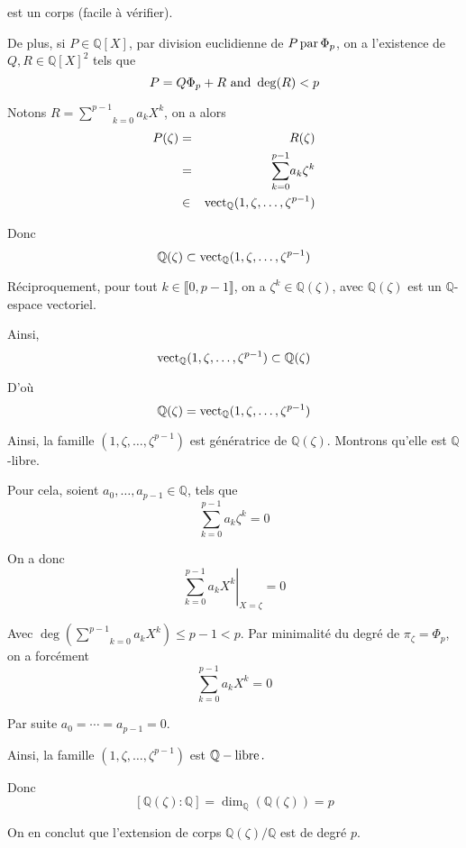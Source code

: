 est un corps (facile {\`a} v{\'e}rifier).

De plus, si $P \in \mathbb{Q} [X]$, par division euclidienne de $P \operatorname{par}
\Phi_p$, on a l'existence de $Q, R \in \mathbb{Q} [X]^2$ tels que
\[ P = Q \Phi_p + R \text{ and } \deg (R) < p \]


Notons $R = \underset{k = 0}{\overset{p - 1}{\sum}} a_k X^k$, on a alors
\begin{eqnarray*}
  P (\zeta) & = & R (\zeta)\\
  & = & \underset{k = 0}{\overset{p - 1}{\sum}} a_k \zeta^k\\
  & \in & \operatorname{vect}_{\mathbb{Q}} (1, \zeta, \ldots, \zeta^{p - 1})
\end{eqnarray*}


Donc
\[ \mathbb{Q} (\zeta) \subset \operatorname{vect}_{\mathbb{Q}} (1, \zeta, \ldots,
   \zeta^{p - 1}) \]


R{\'e}ciproquement, pour tout $k \in \llbracket 0, p - 1 \rrbracket$, on a
$\zeta^k \in \mathbb{Q} (\zeta)$, avec $\mathbb{Q} (\zeta)$ est un
$\mathbb{Q}$-espace vectoriel.

Ainsi,
\[ \operatorname{vect}_{\mathbb{Q}} (1, \zeta, \ldots, \zeta^{p - 1}) \subset
   \mathbb{Q} (\zeta) \]


D'o{\`u}
\[ \mathbb{Q} (\zeta) = \operatorname{vect}_{\mathbb{Q}} (1, \zeta, \ldots, \zeta^{p -
   1}) \]


Ainsi, la famille $(1, \zeta, \ldots, \zeta^{p - 1})$ est g{\'e}n{\'e}ratrice
de $\mathbb{Q} (\zeta)$. Montrons qu'elle est $\mathbb{Q}$-libre.

Pour cela, soient $a_0, \ldots, a_{p - 1} \in \mathbb{Q}$, tels que
\[ \underset{k = 0}{\overset{p - 1}{\sum}} a_k \zeta^k = 0 \]


On a donc
\[ \left. \underset{k = 0}{\overset{p - 1}{\sum}} a_k X^k \right|_{X = \zeta}
   = 0 \]


Avec $\deg \left( \underset{k = 0}{\overset{p - 1}{\sum}} a_k X^k \right)
\leqslant p - 1 < p$. Par minimalit{\'e} du degr{\'e} de $\pi_{\zeta} =
\Phi_p$, on a forc{\'e}ment
\[ \underset{k = 0}{\overset{p - 1}{\sum}} a_k X^k = 0 \]


Par suite $a_0 = \cdots = a_{p - 1} = 0$.

Ainsi, la famille $(1, \zeta, \ldots, \zeta^{p - 1})$ est $\mathbb{Q}-
\operatorname{libre} .$

Donc
\[ [\mathbb{Q} (\zeta) : \mathbb{Q}] = \dim_{\mathbb{Q}} (\mathbb{Q} (\zeta))
   = p \]


On en conclut que l'extension de corps $\mathbb{Q} (\zeta) /\mathbb{Q}$ est de
degr{\'e} $p$.

